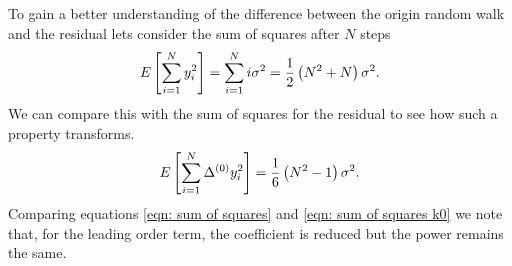 To gain a better understanding of the difference between the origin random walk
and the residual lets consider the sum of squares after $N$ steps 
\begin{equation}
E\left[\sum_{i=1}^{N} y_{i}^{2}\right] = \sum_{i=1}^{N} i \sigma^{2} = 
                               \frac{1}{2}\left(N^{2} + N\right)\sigma^{2}.
\label{eqn: sum of squares}
\end{equation}
We can compare this with the sum of squares for the residual to see how such a
property transforms.  
\begin{equation}
E\left[\sum_{i=1}^{N} \Delta^{(0)} y_{i}^{2}\right] = \frac{1}{6}\left(N^{2} -1\right)\sigma^{2}.
\label{eqn: sum of squares k0}
\end{equation}
Comparing equations \eqref{eqn: sum of squares} and \eqref{eqn: sum of squares k0}
we note that, for the leading
order term, the coefficient is reduced but the power remains the same.  

%

